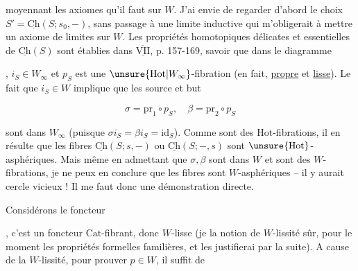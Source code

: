 
moyennant les axiomes qu'il faut sur $W$. J'ai envie de regarder d'abord le choix $S'=\underline{\mathrm{Ch}}(S;s_0,-)$, sans passage à une limite inductive qui m'obligerait à mettre un axiome de limites sur $W$. Les  propriétés homotopiques délicates et essentielles de $\underline{\mathrm{Ch}}(S)$ sont établies dans $\overline{\underline{\mathrm{VII}}}$, p. 157-169, savoir que dans le diagramme

, $i_S\in W_\infty$ et $p_S$ est une $\unsure{\mathrm{Hot}|W_\infty}$-fibration (en fait, \uline{propre} et \uline{lisse}). Le fait que $i_S\in W$ implique que les  source et but


\[
\sigma=\mathrm{pr}_1\circ p_S,\quad \beta=\mathrm{pr}_2\circ p_S
\]

sont dans $W_\infty$ (puisque $\sigma i_S=\beta i_S=\mathrm{id}_S$). Comme  sont des $\mathrm{Hot}$-fibrations, il en résulte que les fibres $\underline{\mathrm{Ch}}(S;s,-)$ ou $\underline{\mathrm{Ch}}(S;-,s)$ sont $\unsure{\mathrm{Hot}}$-asphériques. Mais même en admettant que $\sigma,\beta$ sont dans $W$ et sont des $W$-fibrations, je ne peux en conclure  que les fibres sont $W$-asphériques -- il y aurait cercle vicieux ! Il me faut donc une démonstration directe.

Considérons le foncteur

, c'est un foncteur $\mathrm{Cat}$-fibrant, donc $W$-lisse (je   la notion de $W$-lissité  sûr,   pour le moment les propriétés formelles familières, et les justifierai par la suite). A cause de la $W$-lissité, pour prouver $p\in W$, il suffit de

